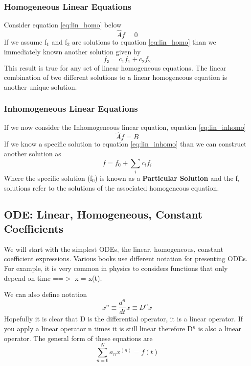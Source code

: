 \documentclass{article}
\newcommand{\be}{\begin{equation}}
\newcommand{\ee}{\end{equation}}
\begin{document}
\subsubsection*{Homogeneous Linear Equations}
Consider equation \ref{eq:lin_homo} below
\be \label{eq:lin_homo}
\hat{A}f = 0
\ee
If we assume f$_1$ and f$_2$ are solutions to equation \ref{eq:lin_homo} than we immediately known another solution given by
\be
f_3 = c_1f_1 + c_2f_2
\ee
This result is true for any set of linear homogeneous equations.
The linear combination of two different solutions to a linear homogeneous equation is another unique solution.

\subsubsection*{Inhomogeneous Linear Equations}
If we now consider the Inhomogeneous linear equation, equation \ref{eq:lin_inhomo}
\be \label{eq:lin_inhomo}
\hat{A}f = B
\ee
If we know a specific solution to equation \ref{eq:lin_inhomo} than we can construct another solution as
\be
f = f_0 + \sum_i c_i f_i
\ee
Where the specific solution (f$_0$) is known as a \textbf{Particular Solution} and the f$_i$ solutions refer to the solutions of the associated homogeneous equation.

\subsection*{ODE: Linear, Homogeneous, Constant Coefficients}
We will start with the simplest ODEs, the linear, homogeneous, constant coefficient expressions.
Various books use different notation for presenting ODEs.
For example, it is very common in physics to considers functions that only depend on time ==$>$ x = x(t).

We can also define notation
\be
x^n \equiv \frac{d^n}{dt}x \equiv D^n x
\ee
Hopefully it is clear that D is the differential operator, it is a linear operator.
If you apply a linear operator n times it is still linear therefore D$^n$ is also a linear operator.
The general form of these equations are
\be \label{eq:lin_cc}
\sum_{n=0}^N a_nx^{(n)} = f(t)
\ee
\end{document}
